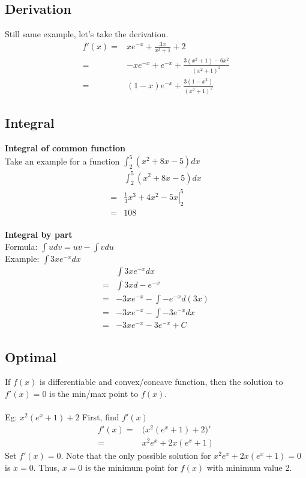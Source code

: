 \documentclass[a4paper,12pt]{article}
\begin{document}
\subsection{Derivation}
Still same example, let's take the derivation.
\begin{equation*}
\begin{split}
f'(x) = & xe^{-x} + \frac{3x}{x^2 + 1} + 2 \\
= & -xe^{-x} + e^{-x} + \frac{3(x^2 + 1) - 6x^2}{(x^2 + 1)^2} \\
= & (1 - x)e^{-x} + \frac{3(1 - x^2)}{(x^2 + 1)^2}
\end{split}
\end{equation*}
\subsection{Integral}
\textbf{Integral of common function} \\
Take an example for a function $\int_{2}^{5} (x^2 + 8x -5)dx$ \\
\begin{equation*}
\begin{split}
& \int_{2}^{5} (x^2 + 8x -5)dx \\
= & \left. \frac{1}{3} x^3 + 4x^2 -5x\right|_2^5 \\ 
= & 108
\end{split}
\end{equation*}
\\
\textbf{Integral by part} \\
Formula: $\int udv = uv - \int vdu$ \\
Example: $\int 3xe^{-x}dx$
\begin{equation*}
\begin{split}
& \int 3xe^{-x} dx \\
= & \int 3x d -e^{-x} \\
= & -3xe^{-x} - \int -e^{-x}d(3x) \\
= & -3xe^{-x} - \int -3e^{-x}dx \\
= & -3xe^{-x} - 3e^{-x} + C
\end{split}
\end{equation*}
\subsection{Optimal}
If $f(x)$ is differentiable and convex/concave function, then the solution to $f'(x) = 0$ is the min/max point to $f(x)$.\\
\\
Eg: $x^2(e^x + 1) + 2$
First, find $f'(x)$
\begin{equation*}
\begin{split}
f'(x) = & \Big( x^2(e^x + 1) + 2\Big)' \\
= & x^2e^x + 2x(e^x + 1) 
\end{split}
\end{equation*}
Set $f'(x) = 0$. Note that the only possible solution for $x^2e^x + 2x(e^x + 1) = 0$ is $x = 0$. Thus, $x = 0$ is the minimum point for $f(x)$ with minimum value 2.
\end{document}
